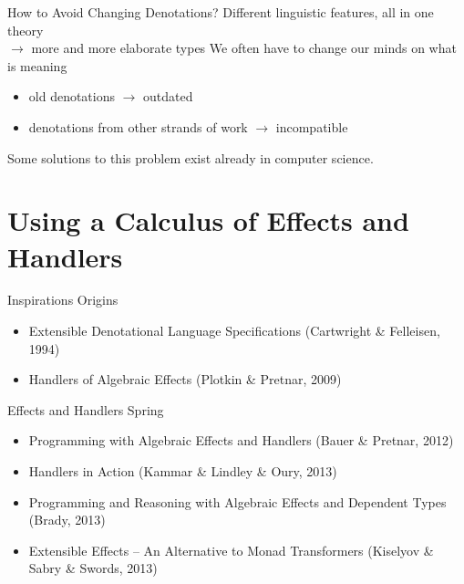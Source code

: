 \documentclass{beamer}
\begin{document}
\begin{frame}{How to Avoid Changing Denotations?}
  Different linguistic features, all in one theory \\
    $\rightarrow$ more and more elaborate types
  \vfill
  \pause
  We often have to change our minds on what is meaning
  \begin{itemize}
  \item old denotations $\rightarrow$ outdated
  \item denotations from other strands of work $\rightarrow$ incompatible
  \end{itemize}
  \pause
  \vfill
  Some solutions to this problem exist already in computer science.
\end{frame}



\section{Using a Calculus of Effects and Handlers}


\begin{frame}{Inspirations}
  Origins
  \begin{itemize}
    \item Extensible Denotational Language Specifications (Cartwright \&
      Felleisen, 1994)
    \item Handlers of Algebraic Effects (Plotkin \& Pretnar, 2009)
  \end{itemize}
  \vfill
  \pause
  Effects and Handlers Spring
  \begin{itemize}
    \item Programming with Algebraic Effects and Handlers (Bauer \&
      Pretnar, 2012)
    \item Handlers in Action (Kammar \& Lindley \& Oury, 2013)
    \item Programming and Reasoning with Algebraic Effects and Dependent
      Types (Brady, 2013)
    \item Extensible Effects -- An Alternative to Monad Transformers
      (Kiselyov \& Sabry \& Swords, 2013)
  \end{itemize}
\end{frame}
\end{document}

